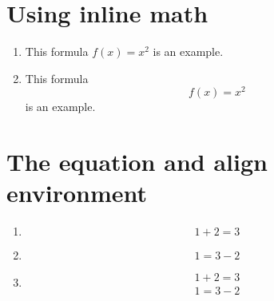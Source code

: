 \documentclass[fleqn]{article}
\begin{document}
	\section{Using inline math}
	
	\begin{enumerate}
	
		\item
		This formula $ f(x) = x^2 $ is an example.
		
		\item
		This formula 
		\begin{displaymath} 
			f(x) = x^2 
		\end{displaymath}
		is an example.	
	
	\end{enumerate}



	\section{The equation and align environment}
	
	\begin{enumerate}

	
		
	
		\item
		\begin{equation*}
			1 + 2 = 3	
		\end{equation*}
	
	 	\item
		\begin{equation*}
			1 = 3 - 2	
		\end{equation*}
	
		\item
		\begin{align*}
			1 + 2 = 3 \\
			1 = 3 - 2
		\end{align*}
	
	\end{enumerate}	
	
\end{document}
